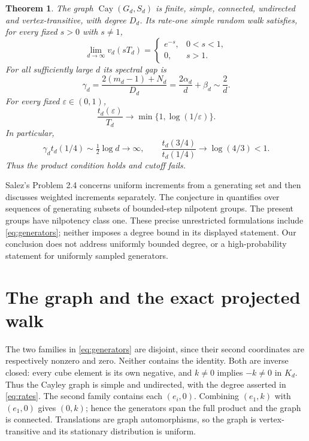 \documentclass[11pt]{article}
\newtheorem{theorem}{Theorem}[section]\newtheorem{lemma}[theorem]{Lemma}
\theoremstyle{remark}\newtheorem{remark}[theorem]{Remark}
\begin{document}
\begin{theorem}\label{thm:main}
The graph $\operatorname{Cay}(G_d,S_d)$ is finite, simple, connected, undirected and vertex-transitive, with degree $D_d$. Its rate-one simple random walk satisfies, for every fixed $s>0$ with $s\ne1$,
\begin{equation}\label{eq:profile}
 \lim_{d\to\infty}v_d(sT_d)=
 \begin{cases} e^{-s},&0<s<1,\\0,&s>1.\end{cases}
\end{equation}
For all sufficiently large $d$ its spectral gap is
\begin{equation}\label{eq:gap}
 \gamma_d=\frac{2(m_d-1)+N_d}{D_d}
 =\frac{2\alpha_d}{d}+\beta_d\sim\frac2d.
\end{equation}
For every fixed $\varepsilon\in(0,1)$,
\begin{equation}\label{eq:mixing}
 \frac{t_d(\varepsilon)}{T_d}\longrightarrow
 \min\{1,\log(1/\varepsilon)\}.
\end{equation}
In particular,
\[
 \gamma_d t_d(1/4)\sim\tfrac12\log d\to\infty,
 \qquad \frac{t_d(3/4)}{t_d(1/4)}\longrightarrow\log(4/3)<1.
\]
Thus the product condition holds and cutoff fails.
\end{theorem}

Salez's Problem 2.4 \cite{Salez} concerns uniform increments from a generating set and then discusses weighted increments separately. The conjecture in \cite[Section 7.4, Conjecture 1]{HOT} quantifies over sequences of generating subsets of bounded-step nilpotent groups. The present groups have nilpotency class one. These precise unrestricted formulations include \eqref{eq:generators}; neither imposes a degree bound in its displayed statement. Our conclusion does not address uniformly bounded degree, or a high-probability statement for uniformly sampled generators.

\section{The graph and the exact projected walk}
The two families in \eqref{eq:generators} are disjoint, since their second coordinates are respectively nonzero and zero. Neither contains the identity. Both are inverse closed: every cube element is its own negative, and $k\ne0$ implies $-k\ne0$ in $K_d$. Thus the Cayley graph is simple and undirected, with the degree asserted in \eqref{eq:rates}. The second family contains each $(e_i,0)$. Combining $(e_1,k)$ with $(e_1,0)$ gives $(0,k)$; hence the generators span the full product and the graph is connected. Translations are graph automorphisms, so the graph is vertex-transitive and its stationary distribution is uniform.
\end{document}

